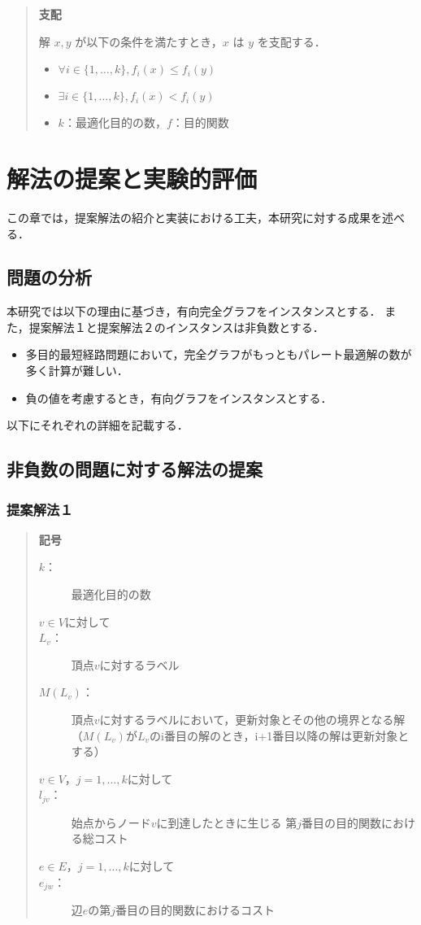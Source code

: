 \documentclass[12pt]{optlab-bachelor}
\begin{document}
\begin{quote}
  \textbf{支配}

    解 $x,y$ が以下の条件を満たすとき，$x$ は $y$ を支配する．
    \begin{itemize}
      \item $\forall i \in \{1,\ldots,k\},f_i(x) \le f_i(y)$
      \item $\exists i \in \{1,\ldots,k\},f_i(x) < f_i(y)$
      \item $k$：最適化目的の数，$f$：目的関数
    \end{itemize}
\end{quote}


\chapter{解法の提案と実験的評価}
この章では，提案解法の紹介と実装における工夫，本研究に対する成果を述べる．

\section{問題の分析}
本研究では以下の理由に基づき，有向完全グラフをインスタンスとする．
また，提案解法１と提案解法２のインスタンスは非負数とする．
\begin{itemize}
\item 多目的最短経路問題において，完全グラフがもっともパレート最適解の数が多く計算が難しい．
\item 負の値を考慮するとき，有向グラフをインスタンスとする．
\end{itemize}
以下にそれぞれの詳細を記載する．


\section{非負数の問題に対する解法の提案}

\subsection{提案解法１}
\begin{quote}
  \textbf{記号}
  \begin{description}
    \item[$k$：] 最適化目的の数
    \item[$v \in V$に対して]
    \item[$L_v$：] 頂点$v$に対するラベル
    \item[$M(L_v)$：] 頂点$v$に対するラベルにおいて，更新対象とその他の境界となる解
    （$M(L_v)$が$L_v$のi番目の解のとき，i+1番目以降の解は更新対象とする）
    \item[$v \in V$，$j = 1 , \ldots , k$に対して]
    \item[$l_{jv}$：] 始点からノード$v$に到達したときに生じる
    第$j$番目の目的関数における総コスト
    \item[$e \in E$，$j = 1 , \ldots , k$に対して]
    \item[$e_{jw}$：] 辺$e$の第$j$番目の目的関数におけるコスト
  \end{description}
\end{quote}
\end{document}

